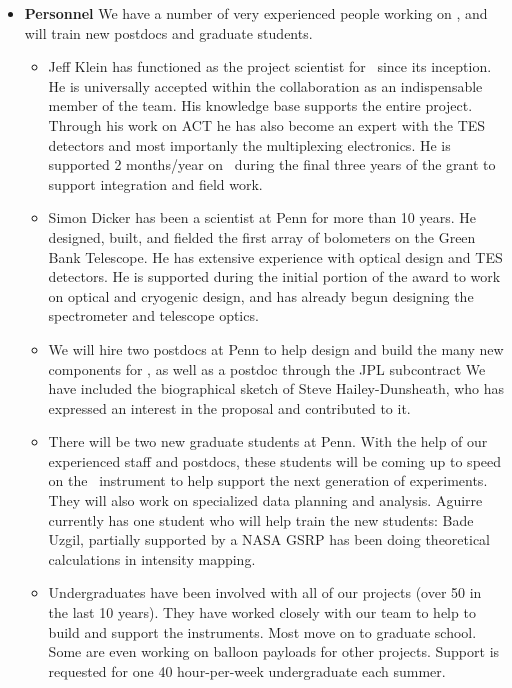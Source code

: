 \begin{itemize}
\item 
{\bf Personnel} We have a number of very experienced people working on
\name, and will train new postdocs and graduate students.

\begin{itemize} 

\item
Jeff Klein has functioned as the project scientist for \blast\ since
its inception.  He is universally accepted within the collaboration as
an indispensable member of the team.  His knowledge base supports the
entire project.  Through his work on ACT he has also become an expert
with the TES detectors and most importanly the multiplexing
electronics. He is supported 2 months/year on \name\ during the
final three years of the grant to support integration and field work.

\item
Simon Dicker has been a scientist at Penn for more than 10 years.  He
designed, built, and fielded the first array of bolometers on the
Green Bank Telescope. He has extensive experience with optical design
and TES detectors.  He is supported during the initial portion of the
award to work on optical and cryogenic design, and has already begun
designing the spectrometer and telescope optics.

\item
We will hire two postdocs at Penn to help design and build the many
new components for \name, as well as a postdoc through the JPL
subcontract
We have included
the biographical sketch of Steve Hailey-Dunsheath, who has 
expressed an interest
in the proposal and contributed to it.

\item
There will be two new graduate students at Penn.  With the help of our
experienced staff and postdocs, these students will be coming up to
speed on the \name\ instrument to help support the next generation
of experiments.  They will also work on specialized data planning and
analysis.  Aguirre currently has one student who will help train the new students: Bade Uzgil, partially supported by a NASA GSRP has been
doing theoretical calculations in intensity mapping.

\item
Undergraduates have been involved with all of our projects (over 50 in
the last 10 years).  They have worked closely with our team to help to
build and support the instruments.  Most move on to graduate school.  Some
are even working on balloon payloads for other projects.  Support is
requested for one 40 hour-per-week undergraduate each summer.


\end{itemize}
\end{itemize}
